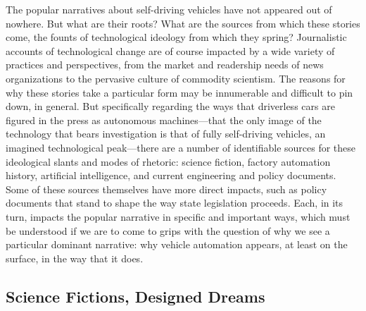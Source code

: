 The popular narratives about self-driving vehicles have not appeared
out of nowhere. But what are their roots? What are the sources from which
these stories come, the founts of technological ideology from which
they spring? Journalistic accounts of technological change are of
course impacted by a wide variety of practices and perspectives, from
the market and readership needs of news organizations to the pervasive
culture of commodity scientism.\cite{smithSelling} The
reasons for why these stories take a particular form may be innumerable
and difficult to pin down, in general. But specifically regarding the ways that
driverless cars are figured in the press as autonomous
machines---that the only image of the technology that bears
investigation is that of fully self-driving vehicles, an imagined
technological peak---there
are a number of identifiable sources for these ideological slants and
modes of rhetoric: science fiction, factory automation history,
artificial intelligence, and current engineering and policy documents. Some of
these sources themselves have more direct impacts, such as
policy documents that stand to shape the way state legislation proceeds. Each,
in its turn, impacts the popular narrative in specific and important
ways, which must be understood if we are to come to grips with the
question of why we see a particular dominant narrative:  why vehicle
automation appears, at least on the surface, in the way that it does.

\subsection{Science Fictions, Designed Dreams}

